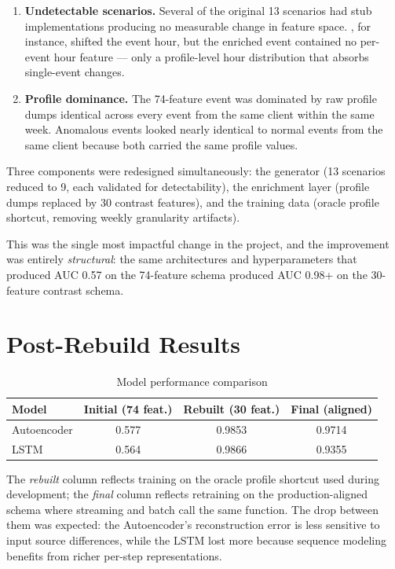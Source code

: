 \begin{enumerate}
  \item \textbf{Undetectable scenarios.} Several of the original 13 scenarios had stub implementations producing no measurable change in feature space. , for instance, shifted the event hour, but the enriched event contained no per-event hour feature --- only a profile-level hour distribution that absorbs single-event changes.
  \item \textbf{Profile dominance.} The 74-feature event was dominated by raw profile dumps identical across every event from the same client within the same week. Anomalous events looked nearly identical to normal events from the same client because both carried the same profile values.
\end{enumerate}

Three components were redesigned simultaneously: the generator (13 scenarios reduced to 9, each validated for detectability), the enrichment layer (profile dumps replaced by 30 contrast features), and the training data (oracle profile shortcut, removing weekly granularity artifacts).

This was the single most impactful change in the project, and the improvement was entirely \emph{structural}: the same architectures and hyperparameters that produced AUC 0.57 on the 74-feature schema produced AUC 0.98+ on the 30-feature contrast schema.

\section{Post-Rebuild Results}

\begin{table}[htbp]
\centering
\small
\caption{Model performance comparison}
\begin{tabular}{@{}lccc@{}}
\toprule
\textbf{Model} & \textbf{Initial (74 feat.)} & \textbf{Rebuilt (30 feat.)} & \textbf{Final (aligned)} \\
\midrule
Autoencoder & 0.577 & 0.9853 & 0.9714 \\
LSTM & 0.564 & 0.9866 & 0.9355 \\
\bottomrule
\end{tabular}
\end{table}

The \emph{rebuilt} column reflects training on the oracle profile shortcut used during development; the \emph{final} column reflects retraining on the production-aligned schema where streaming and batch call the same  function. The drop between them was expected: the Autoencoder's reconstruction error is less sensitive to input source differences, while the LSTM lost more because sequence modeling benefits from richer per-step representations.

